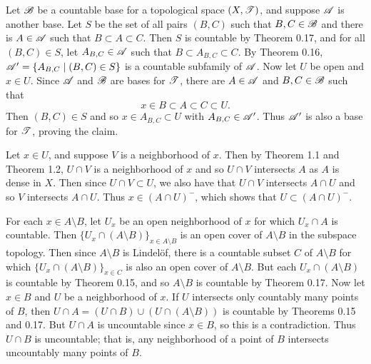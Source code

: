 \begin{prob}
Let $\mathscr{B}$ be a countable base for a topological space $(X, \mathscr{T})$, and suppose $\mathscr{A}$ is another base. Let $S$ be the set of all pairs $(B, C)$ such that $B, C \in \mathscr{B}$ and there is $A \in \mathscr{A}$ such that $B \subset A \subset C$. Then $S$ is countable by Theorem 0.17, and for all $(B, C) \in S$, let $A_{B, C} \in \mathscr{A}$ such that $B \subset A_{B, C} \subset C$. By Theorem 0.16, $\mathscr{A}' = \{A_{B, C}\mid (B, C) \in S\}$ is a countable subfamily of $\mathscr{A}$. Now let $U$ be open and $x \in U$. Since $\mathscr{A}$ and $\mathscr{B}$ are bases for $\mathscr{T}$, there are $A \in \mathscr{A}$ and $B, C \in \mathscr{B}$ such that \[x \in B \subset A \subset C \subset U.\] Then $(B, C) \in S$ and so $x \in A_{B, C} \subset U$ with $A_{B, C} \in \mathscr{A}'$. Thus $\mathscr{A}'$ is also a base for $\mathscr{T}$, proving the claim.
\end{prob}

\begin{prob}
Let $x \in U$, and suppose $V$ is a neighborhood of $x$. Then by Theorem 1.1 and Theorem 1.2, $U\cap V$ is a neighborhood of $x$ and so $U\cap V$ intersects $A$ as $A$ is dense in $X$. Then since $U\cap V \subset U$, we also have that $U\cap V$ intersects $A\cap U$ and so $V$ intersects $A\cap U$. Thus $x \in (A\cap U)^-$, which shows that $U \subset (A\cap U)^-$.
\end{prob}

\begin{prob}
For each $x \in A\setminus B$, let $U_x$ be an open neighborhood of $x$ for which $U_x\cap A$ is countable. Then $\{U_x\cap (A\setminus B)\}_{x \in A\setminus B}$ is an open cover of $A\setminus B$ in the subspace topology. Then since $A\setminus B$ is Lindelöf, there is a countable subset $C$ of $A\setminus B$ for which $\{U_x\cap(A\setminus B)\}_{x \in C}$ is also an open cover of $A\setminus B$. But each $U_x\cap(A\setminus B)$ is countable by Theorem 0.15, and so $A\setminus B$ is countable by Theorem 0.17. Now let $x \in B$ and $U$ be a neighborhood of $x$. If $U$ intersects only countably many points of $B$, then $U\cap A = (U\cap B)\cup(U\cap (A\setminus B))$ is countable by Theorems 0.15 and 0.17. But $U\cap A$ is uncountable since $x \in B$, so this is a contradiction. Thus $U\cap B$ is uncountable; that is, any neighborhood of a point of $B$ intersects uncountably many points of $B$.
\end{prob}

